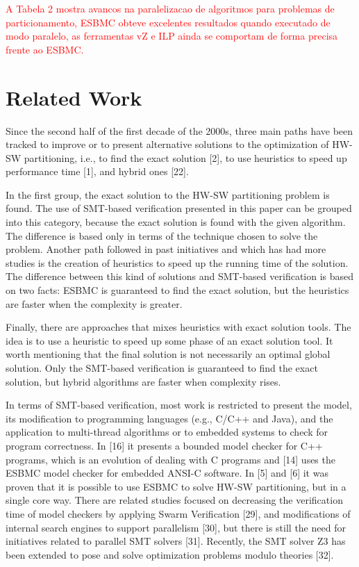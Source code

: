 \textcolor{Red}{A Tabela 2 mostra avancos na paralelizacao de algoritmos para problemas de particionamento, ESBMC obteve excelentes resultados quando executado de modo paralelo, as ferramentas vZ e ILP ainda se comportam de forma precisa frente ao ESBMC.} 

\section{Related Work}
Since the second half of the first decade of the 2000s, three main paths have been tracked to improve or to present alternative solutions to the optimization of HW-SW partitioning, i.e., to find the exact solution [2], to use heuristics to speed up performance time [1], and hybrid ones [22].

In the first group, the exact solution to the HW-SW partitioning problem is found. The use of SMT-based verification presented in this paper can be grouped into this category, because the exact solution is found with the given algorithm. The difference is based only in terms of the technique chosen to solve the problem.
Another path followed in past initiatives and which has had more studies is the creation of heuristics to speed up the running time of the solution. The difference between this kind of solutions and SMT-based verification is based on two facts: ESBMC is guaranteed to find the exact solution, but the heuristics are faster when the complexity is greater.

Finally, there are approaches that mixes heuristics with exact solution tools. The idea is to use a heuristic to speed up some phase of an exact solution tool. It worth mentioning that the final solution is not necessarily an optimal global solution. Only the SMT-based verification is guaranteed to find the exact solution, but hybrid algorithms are faster when complexity rises.

In terms of SMT-based verification, most work is restricted to present the model, its modification to programming languages (e.g., C/C++ and Java), and the application to multi-thread algorithms or to embedded systems to check for program correctness. In [16] it presents a bounded model checker for C++ programs, which is an evolution of dealing with C programs and [14] uses the ESBMC model checker for embedded ANSI-C software. In [5] and [6] it was proven that it is possible to use ESBMC to solve HW-SW partitioning, but in a single core way. There are related studies focused on decreasing the verification time of model checkers by applying Swarm Verification [29], and modifications of internal search engines to support parallelism [30], but there is still the need for initiatives related to parallel SMT solvers [31]. Recently, the SMT solver Z3 has been extended to pose and solve optimization problems modulo theories [32].
